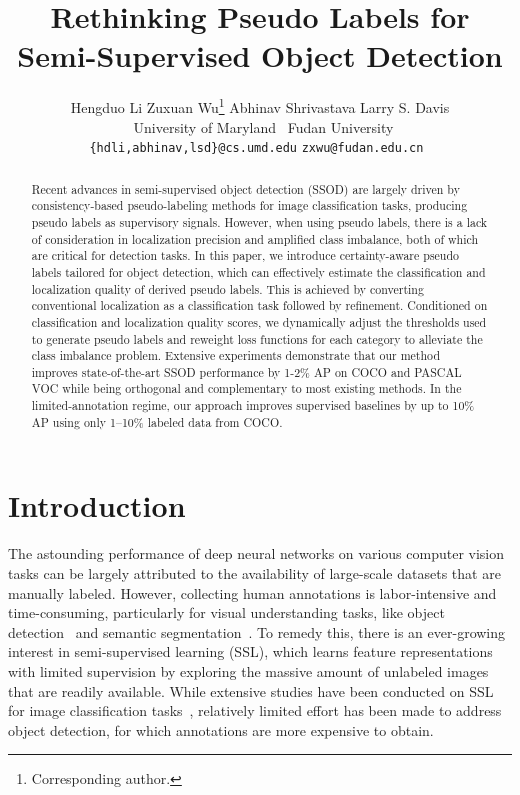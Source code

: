 \documentclass[letterpaper]{article} \usepackage{aaai22}  \usepackage{times}  \usepackage{helvet}  \usepackage{courier}  \usepackage[hyphens]{url}  \usepackage{graphicx} \urlstyle{rm} \def\UrlFont{\rm}  \usepackage{natbib}  \usepackage{caption} \DeclareCaptionStyle{ruled}{labelfont=normalfont,labelsep=colon,strut=off} \frenchspacing  \setlength{\pdfpagewidth}{8.5in}  \setlength{\pdfpageheight}{11in}  \usepackage{algorithm}
\title{Rethinking Pseudo Labels for Semi-Supervised Object Detection}
\author{Hengduo Li \qquad Zuxuan Wu\thanks{Corresponding author.} \qquad Abhinav Shrivastava \qquad Larry S. Davis \\
~University of Maryland \qquad ~Fudan University \\
{\tt\small \{hdli,abhinav,lsd\}@cs.umd.edu} \quad \tt\small zxwu@fudan.edu.cn
}
\begin{document}
\maketitle

\begin{abstract}
Recent advances in semi-supervised object detection (SSOD) are largely driven by consistency-based pseudo-labeling methods for image classification tasks, producing pseudo labels as supervisory signals. However, when using pseudo labels, there is a lack of consideration in localization precision and amplified class imbalance, both of which are critical for detection tasks. In this paper, we introduce certainty-aware pseudo labels tailored for object detection, which can effectively estimate the classification and localization quality of derived pseudo labels. This is achieved by converting conventional localization as a classification task followed by refinement. Conditioned on classification and localization quality scores, we dynamically adjust the thresholds used to generate pseudo labels and reweight loss functions for each category to alleviate the class imbalance problem. Extensive experiments demonstrate that our method improves state-of-the-art SSOD performance by 1-2\% AP on COCO and PASCAL VOC while being orthogonal and complementary to most existing methods. In the limited-annotation regime, our approach improves supervised baselines by up to 10\% AP using only 1--10\% labeled data from COCO. 

\end{abstract}



\section{Introduction}
\label{sec:intro}

The astounding performance of deep neural networks on various computer vision tasks can be largely attributed to the availability of large-scale datasets that are manually labeled. However, collecting human annotations is labor-intensive and time-consuming, particularly for visual understanding tasks, like object detection~\cite{coco,openimages} and semantic segmentation~\cite{voc,cityscapes}. To remedy this, there is an ever-growing interest in semi-supervised learning (SSL), which learns feature representations with limited supervision by exploring the massive amount of unlabeled images that are readily available. While extensive studies have been conducted on SSL for image classification tasks~\cite{berthelot2019mixmatch,uda,sohn2020fixmatch,berthelot2019mixmatch,xie2020self,laine2016temporal,miyato2018virtual,bachman2014learning}, relatively limited effort has been made to address object detection, for which annotations are more expensive to obtain. 
\end{document}
